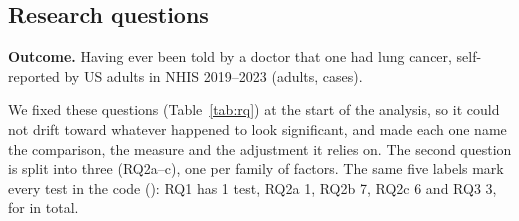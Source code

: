 \subsection{Research questions}\label{sec:rq}

\textbf{Outcome.} Having ever been told by a doctor that one had lung cancer, self-reported by US adults in NHIS 2019--2023 (\nAdults adults, \nCases cases).

We fixed these questions (Table~\ref{tab:rq}) at the start of the analysis, so it could not drift toward whatever happened to look significant, and made each one name the comparison, the measure and the adjustment it relies on. The second question is split into three (RQ2a--c), one per family of factors. The same five labels mark every test in the code (): RQ1 has 1 test, RQ2a 1, RQ2b 7, RQ2c 6 and RQ3 3, for \nTests in total.

